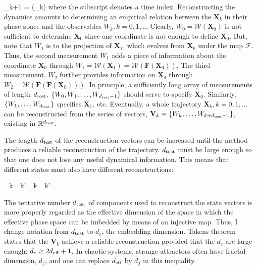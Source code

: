 \beq
\label{dyn_sys_approx}
{}_{k+1} = {} ({}_k)
\eeq
where the subscript denotes a time index. Reconstructing the dynamics amounts to determining an empirical relation between the ${\mathbf{X}}_k$ in their phase space and the observables
$W_k, k=0,1, \ldots$ Clearly, $W_0 = {\mathcal{W}}({\mathbf{X}}_0)$ is not sufficient to determine ${\mathbf{X}}_0$ since one coordinate is not enough to define ${\mathbf{X}}_0$. But, note that
$W_1$ is to the projection of ${\mathbf{X}}_1$, which evolves from ${\mathbf{X}}_0$ under the map $\mathbf{\mathcal{F}}$. Thus, the second measurement $W_1$ adds a piece of information
about the coordinate ${\mathbf{X}}_0$ through $W_1 = {\mathcal{W}}({\mathbf{X}}_1) = {\mathcal{W}}({\mathcal{\mathbf{F}}} ({\mathbf{X}}_0))$. The third measurement, $W_2$ further provides information
on ${\mathbf{X}}_0$ through $W_2 = {\mathcal{W}}(\mathcal{\mathbf{F}} (\mathcal{\mathbf{F}} ({\mathbf{X}}_0)))$. 
In principle, a sufficiently long array of measurements of length $d_{\rm{test}}$, $\{W_0, W_1, \ldots , W_{d_{\rm{test}}-1}\}$ should serve to specify
${\mathbf{X}}_0$. Similarly, $\{W_1, \ldots , W_{d_{\rm{test}}}\}$ specifies ${\mathbf{X}}_1$, etc. 
Eventually, a whole trajectory ${\mathbf{X}}_k, k=0,1,\ldots$ can be reconstructed from the series of vectors,
${\mathbf{V}}_k = \{W_k, \ldots , W_{k+d_{\rm{test}}-1}\}$, existing in ${\mathbb{R}}^{d_{\rm{test}}}$.

The length $d_{\rm{test}}$ of the reconstruction vectors can be increased until the method produces a reliable reconstruction of the trajectory. $d_{\rm{test}}$ must be large enough so that one does
not lose any useful dynamical information. This means that different states must also have different reconstructions:

\beq
\label{diff_recons}
{}_k _{k'} _k _{k'}
\eeq

The tentative number $d_{\rm{test}}$ of components used to reconstruct the state vectors is more properly regarded as the effective dimension of the space in which the effective phase space
can be imbedded by means of an injective map. Thus, I change notation from $d_{\rm{test}}$ to $d_e$, the embedding dimension. Takens theorem states that the ${\mathbf{V}}_k$ achieve
a reliable reconstruction provided that the $d_e$ are large enough: $d_e \ge 2 d_{\rm{eff}} + 1$. In chaotic systems, strange attractors often have fractal dimension, $d_f$, and one can
replace $d_{\rm{eff}}$ by $d_f$ in this inequality.

